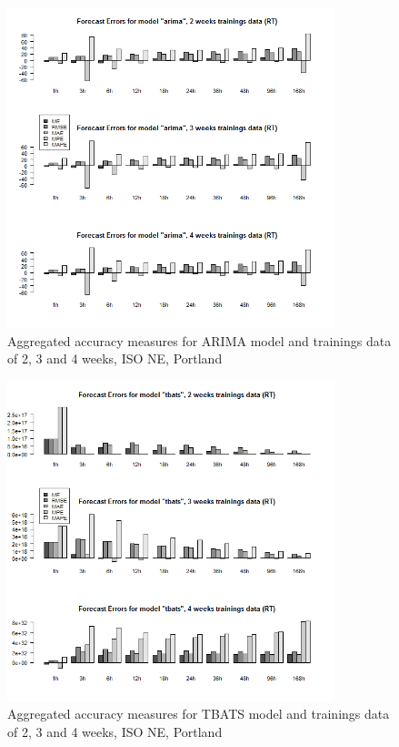 \begin{figure}[!ht]
	\centering
		\includegraphics[width=0.85\textwidth]{figures/appendix_forecast_results/rt_sim_4_x_1w_1w_arima.png}
	\caption{Aggregated accuracy measures for ARIMA model and trainings data of 2, 3 and 4 weeks, ISO NE, Portland}
	\label{fig:app_rt_sim_4_x_1w_1w_arima}
	\vspace*{-1.6in}
\end{figure}




\begin{figure}[!ht]
	\centering
		\includegraphics[width=0.85\textwidth]{figures/appendix_forecast_results/rt_sim_4_x_1w_1w_tbats.png}
	\caption{Aggregated accuracy measures for TBATS model and trainings data of 2, 3 and 4 weeks, ISO NE, Portland}
	\label{fig:app_rt_sim_4_x_1w_1w_tbats}
\end{figure}




